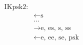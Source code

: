 \documentclass[tikz]{standalone}
\begin{document}
\label{not:IKpsk2}
$
\begin{array}{rl}
\text{IKpsk2:}\\
&\leftarrow \text{s}\\
&\cdots\\
&\rightarrow \text{e, es, s, ss}\\
&\leftarrow \text{e, ee, se, psk}\\
\end{array}
$
\end{document}
